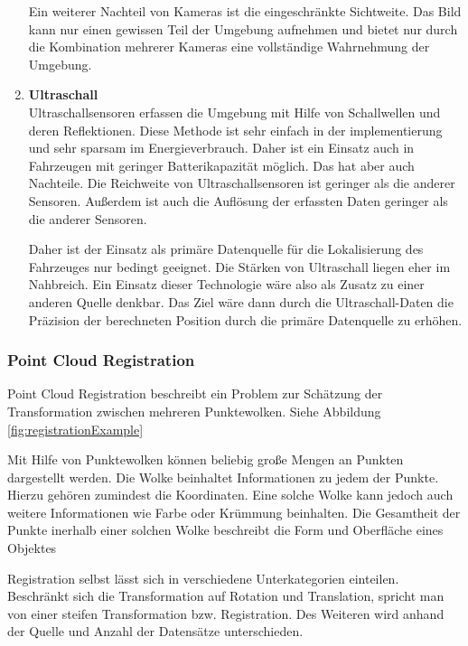 \begin{enumerate}[leftmargin=*]
    Ein weiterer Nachteil von Kameras ist die eingeschränkte Sichtweite. 
    Das Bild kann nur einen gewissen Teil der Umgebung aufnehmen und bietet nur durch die Kombination mehrerer Kameras eine vollständige Wahrnehmung der Umgebung.

    \item \textbf{Ultraschall} \\
    Ultraschallsensoren erfassen die Umgebung mit Hilfe von Schallwellen und deren Reflektionen. 
    Diese Methode ist sehr einfach in der implementierung und sehr sparsam im Energieverbrauch. 
    Daher ist ein Einsatz auch in Fahrzeugen mit geringer Batterikapazität möglich.
    Das hat aber auch Nachteile. 
    Die Reichweite von Ultraschallsensoren ist geringer als die anderer Sensoren. 
    Außerdem ist auch die Auflösung der erfassten Daten geringer als die anderer Sensoren.

    Daher ist der Einsatz als primäre Datenquelle für die Lokalisierung des Fahrzeuges nur bedingt geeignet.
    Die Stärken von Ultraschall liegen eher im Nahbreich.
    Ein Einsatz dieser Technologie wäre also als Zusatz zu einer anderen Quelle denkbar. 
    Das Ziel wäre dann durch die Ultraschall-Daten die Präzision der berechneten Position durch die primäre Datenquelle zu erhöhen. 
\end{enumerate}

\subsubsection{Point Cloud Registration}
\label{pcl}
Point Cloud Registration beschreibt ein Problem zur Schätzung der Transformation zwischen mehreren Punktewolken. Siehe Abbildung \ref{fig:registrationExample}

Mit Hilfe von Punktewolken können beliebig große Mengen an Punkten dargestellt werden.
Die Wolke beinhaltet Informationen zu jedem der Punkte.
Hierzu gehören zumindest die Koordinaten.
Eine solche Wolke kann jedoch auch weitere Informationen wie Farbe oder Krümmung beinhalten. 
Die Gesamtheit der Punkte inerhalb einer solchen Wolke beschreibt die Form und Oberfläche eines Objektes
\cite[chapters 2.2]{registration2021}

Registration selbst lässt sich in verschiedene Unterkategorien einteilen.
Beschränkt sich die Transformation auf Rotation und Translation, spricht man von einer steifen Transformation bzw. Registration.
Des Weiteren wird anhand der Quelle und Anzahl der Datensätze unterschieden.

